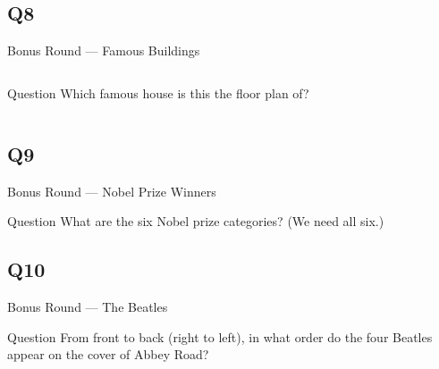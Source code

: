 \documentclass[11pt]{beamer}
\begin{document}
\subsection*{Q8}
\begin{frame}[t]{Bonus Round --- Famous Buildings}
\vspace{-0.5em}
\begin{columns}[T,totalwidth=\linewidth]
\begin{column}{0.32\linewidth}
\begin{block}{Question}
Which famous house is this the floor plan of?
\end{block}
\end{column}
\begin{column}{0.65\linewidth}
\begin{center}
\texttt{[image: \{Images/fallingwaterfloorplan]}.jpg}
\end{center}
\end{column}
\end{columns}
\end{frame}
\subsection*{Q9}
\begin{frame}[t]{Bonus Round --- Nobel Prize Winners}
\vspace{-0.5em}
\begin{block}{Question}
What are the six Nobel prize categories? (We need all six.)
\end{block}
\end{frame}
\subsection*{Q10}
\begin{frame}[t]{Bonus Round --- The Beatles}
\vspace{-0.5em}
\begin{block}{Question}
From front to back (right to left), in what order do the four Beatles appear on the cover of Abbey Road?
\end{block}
\end{frame}
\end{document}
